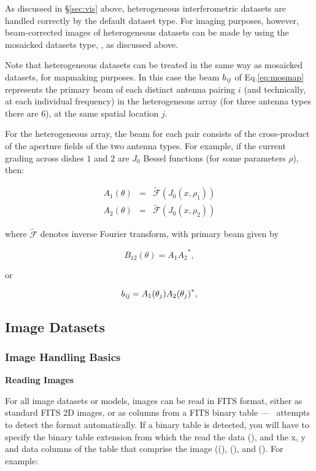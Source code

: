 As discussed in \S\ref{sec:vis} above, heterogeneous interferometric
datasets are handled correctly by the default  dataset
type.  For imaging purposes, however, beam-corrected images of
heterogeneous datasets can be made by using the mosaicked datasets
type, , as discussed above.

Note that heterogeneous datasets can be treated in the same way as
mosaicked datasets, for mapmaking purposes.  In this case the beam
$b_{{\it ij}}$ of Eq.\ref{eq:mosmap} represents the primary beam of each
distinct antenna pairing $i$ (and technically, at each individual
frequency) in the heterogeneous array (for three antenna types there
are 6), at the same spatial location $j$.

For the heterogeneous array, the beam for each pair consists of the
cross-product of the aperture fields of the two antenna types.  For
example, if the current grading across dishes $1$ and $2$ are $J_0$
Bessel functions (for some parameters $\rho$), then:

\begin{eqnarray}\nonumber
A_1(\theta) &=& \tilde{\mathcal{F}}(J_0(x, \rho_1))\\\nonumber
A_2(\theta) &=& \tilde{\mathcal{F}}(J_0(x, \rho_2))
\end{eqnarray}

where $\tilde{\mathcal{F}}$ denotes inverse Fourier transform, with primary beam given by

\begin{equation}
B_{12}(\theta) = A_1{A_2}^*,
\end{equation}

or 

\begin{equation}
b_{{\it ij}} = A_1(\theta_j){A_2(\theta_j)}^*,
\end{equation}

\subsection{Image Datasets}
\label{sec:image}

\subsubsection{Image Handling Basics}
\label{sec:imagehandling}

{\bf Reading Images}

For all image datasets or models, images can be read in FITS format,
either as standard FITS 2D images, or as columns from a FITS binary
table --- \climax\ attempts to detect the format automatically.  If a
binary table is detected, you will have to specify the binary table
extension from which the read the data (), and the x,
y and data columns of the table that comprise the image
((), (), and ().  For
example:

